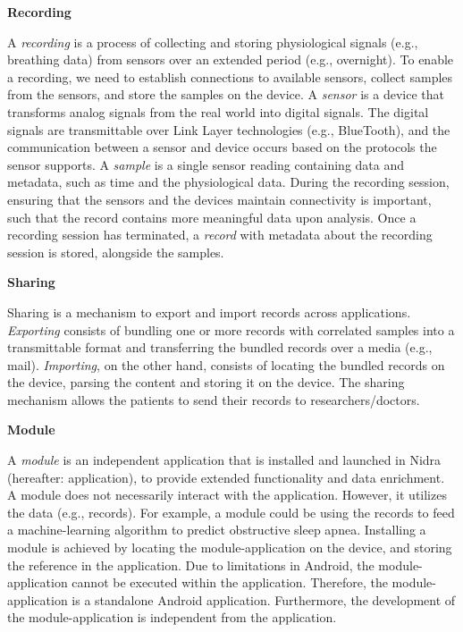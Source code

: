 
\noindent\textbf{Recording}

\noindent A \textit{recording} is a process of collecting and storing physiological signals (e.g., breathing data) from sensors over an extended period (e.g., overnight). To enable a recording, we need to establish connections to available sensors, collect samples from the sensors, and store the samples on the device. A \textit{sensor} is a device that transforms analog signals from the real world into digital signals. The digital signals are transmittable over Link Layer technologies (e.g., BlueTooth), and the communication between a sensor and device occurs based on the protocols the sensor supports. A \textit{sample} is a single sensor reading containing data and metadata, such as time and the physiological data. During the recording session, ensuring that the sensors and the devices maintain connectivity is important, such that the record contains more meaningful data upon analysis.  Once a recording session has terminated, a \textit{record} with metadata about the recording session is stored, alongside the samples.  

\newpage
\noindent \textbf{Sharing}

\noindent Sharing is a mechanism to export and import records across applications. \textit{Exporting} consists of bundling one or more records with correlated samples into a transmittable format and transferring the bundled records over a media (e.g., mail). \textit{Importing}, on the other hand, consists of locating the bundled records on the device, parsing the content and storing it on the device. The sharing mechanism allows the patients to send their records to researchers/doctors.

\noindent \textbf{Module}

\noindent A \textit{module} is an independent application that is installed and launched in Nidra (hereafter: application), to provide extended functionality and data enrichment. A module does not necessarily interact with the application. However, it utilizes the data (e.g., records). For example, a module could be using the records to feed a machine-learning algorithm to predict obstructive sleep apnea. Installing a module is achieved by locating the module-application on the device, and storing the reference in the application. Due to limitations in Android, the module-application cannot be executed within the application. Therefore, the module-application is a standalone Android application. Furthermore, the development of the module-application is independent from the application. 


